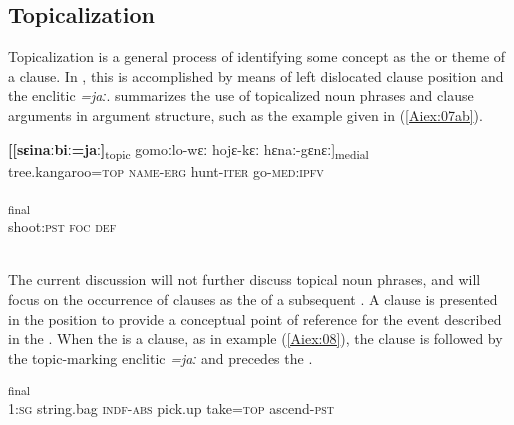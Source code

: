\documentclass[output=paper]{LSP/langsci}
\begin{document}
\subsection{Topicalization} 
\label{AiTopicalization}
Topicalization is a general process of identifying some concept as the  or theme of a clause.
In , this is accomplished by means of left dislocated clause position and the enclitic \textit{=jaː}. \citet{Aiton.2014} summarizes the use of topicalized noun phrases and clause arguments in  argument
structure, such as the example given in (\ref{Aiex:07ab}).

\begin{exe}
\ex \label{Aiex:07ab}
\begin{xlist}
\ex \label{Aiex:07a}
\gll \textbf{[[sɛinaːbiː=jaː]}\textsubscript{topic}	gomoːlo-wɛː	hojɛ-kɛː	hɛnaː-gɛnɛː]\textsubscript{medial}\\
tree.kangaroo=\textsc{top}	\textsc{name}-\textsc{erg}	hunt-\textsc{iter}	go-\textsc{med}:\textsc{ipfv}\\
\glt {}\\
\ex \label{Aiex:07b}
\textsubscript{final}\\
shoot:\textsc{pst}	\textsc{foc}	\textsc{def}\\
\glt {}\\
\end{xlist}
\end{exe}

The current discussion will not further discuss topical noun phrases, and will focus on the occurrence of clauses as the  of a subsequent .
	A clause is presented in the  position to provide a conceptual point of reference for the event described in the . When the  is a clause, as in example (\ref{Aiex:08}), the clause is followed by the topic-marking enclitic \textit{=jaː} and precedes the .

\begin{exe}
\ex \label{Aiex:08}
\textsubscript{final}\\
1:\textsc{sg}	string.bag	\textsc{indf}-\textsc{abs}	pick.up	take=\textsc{top}	ascend-\textsc{pst}\\
\glt {}\\
\end{exe}
\end{document}
